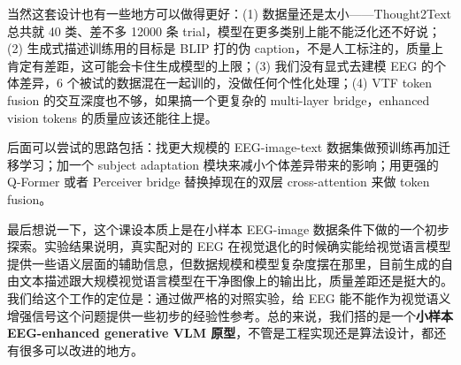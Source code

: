 当然这套设计也有一些地方可以做得更好：(1) 数据量还是太小——Thought2Text 总共就 40 类、差不多 12000 条 trial，模型在更多类别上能不能泛化还不好说；(2) 生成式描述训练用的目标是 BLIP 打的伪 caption，不是人工标注的，质量上肯定有差距，这可能会卡住生成模型的上限；(3) 我们没有显式去建模 EEG 的个体差异，6 个被试的数据混在一起训的，没做任何个性化处理；(4) VTF token fusion 的交互深度也不够，如果搞一个更复杂的 multi-layer bridge，enhanced vision tokens 的质量应该还能往上提。

后面可以尝试的思路包括：找更大规模的 EEG-image-text 数据集做预训练再加迁移学习；加一个 subject adaptation 模块来减小个体差异带来的影响；用更强的 Q-Former 或者 Perceiver bridge 替换掉现在的双层 cross-attention 来做 token fusion。

最后想说一下，这个课设本质上是在小样本 EEG-image 数据条件下做的一个初步探索。实验结果说明，真实配对的 EEG 在视觉退化的时候确实能给视觉语言模型提供一些语义层面的辅助信息，但数据规模和模型复杂度摆在那里，目前生成的自由文本描述跟大规模视觉语言模型在干净图像上的输出比，质量差距还是挺大的。我们给这个工作的定位是：通过做严格的对照实验，给 EEG 能不能作为视觉语义增强信号这个问题提供一些初步的经验性参考。总的来说，我们搭的是一个\textbf{小样本 EEG-enhanced generative VLM 原型}，不管是工程实现还是算法设计，都还有很多可以改进的地方。

